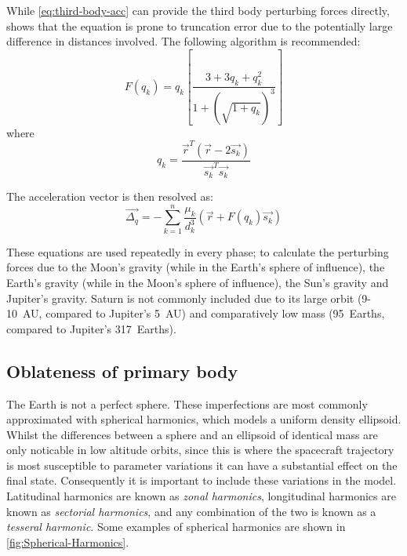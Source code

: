 While \autoref{eq:third-body-acc} can provide the third body perturbing forces directly, \textcite{Battin1999} shows that the equation is prone to truncation error due to the potentially large difference in distances involved. The following algorithm is recommended:
\begin{equation} \label{eq:Fqk}
F(q_{k}) = q_{k}\left[ \frac{3+3q_{k}+q_{k}^{2}}{1+(\sqrt{1+q_{k}})^{3}} \right] 
\end{equation} 
where
\begin{equation}
q_{k} = \frac{\vec{r}^{T}(\vec{r}-2\vec{s_{k}})}{\vec{s_{k}}^{T}\vec{s_{k}}}
\end{equation}

The acceleration vector is then resolved as:
\begin{equation}
\vec{\Delta_q} = -\sum_{k=1}^{n}\frac{\mu_{k}}{d_{k}^{3}}(\vec{r}+F(q_{k})\vec{s_{k}})
\end{equation}

These equations are used repeatedly in every phase; to calculate the perturbing forces due to the Moon's gravity (while in the Earth's sphere of influence), the Earth's gravity (while in the Moon's sphere of influence), the Sun's gravity and Jupiter's gravity. Saturn is not commonly included due to its large orbit (9-10~AU, compared to Jupiter's 5~AU) and comparatively low mass (95~Earths, compared to Jupiter's 317~Earths).



\subsection{Oblateness of primary body} \label{sub:Oblateness}

The Earth is not a perfect sphere. These imperfections are most commonly approximated with spherical harmonics, which models a uniform density ellipsoid. Whilst the differences between a sphere and an ellipsoid of identical mass are only noticable in low altitude orbits, since this is where the spacecraft trajectory is most susceptible to parameter variations it can have a substantial effect on the final state. Consequently it is important to include these variations in the model. Latitudinal harmonics are known as \emph{zonal harmonics}, longitudinal harmonics are known as \emph{sectorial harmonics}, and any combination of the two is known as a \emph{tesseral harmonic}. Some examples of spherical harmonics are shown in \autoref{fig:Spherical-Harmonics}.

